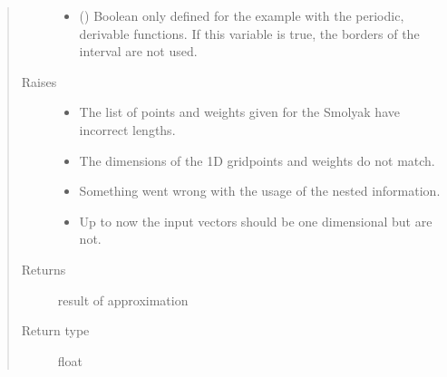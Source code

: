 \documentclass[letterpaper,10pt,english]{sphinxmanual}
\begin{document}
\begin{fulllineitems}
\begin{quote}
\begin{description}
\begin{itemize}
\item {} 
 (\sphinxstyleliteralemphasis{\sphinxupquote{, }}) \textendash{} Boolean only defined for the example with the periodic, derivable functions.
If this variable is true, the borders of the interval are not used.

\end{itemize}

\item[{Raises}] \leavevmode\begin{itemize}
\item {} 
 \textendash{} The list of points and weights given for the Smolyak have incorrect lengths.

\item {} 
 \textendash{} The dimensions of the 1D gridpoints and weights do not match.

\item {} 
 \textendash{} Something went wrong with the usage of the nested information.

\item {} 
 \textendash{} Up to now the input vectors should be one dimensional but are not.

\end{itemize}

\item[{Returns}] \leavevmode
result of approximation

\item[{Return type}] \leavevmode
float

\end{description}\end{quote}

\end{fulllineitems}

\end{document}
